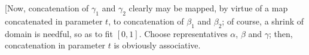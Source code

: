 \documentclass[12pt]{article}
\newcommand\aG\alpha \newcommand\bG\beta  \newcommand\gG\gamma \newcommand\dG\delta \newcommand\eG\varepsilon \newcommand\zG\zeta \newcommand\tG\theta \newcommand\kG\kappa \newcommand\lG\lambda \newcommand\sG\sigma \newcommand\fG\varphi \newcommand\oG\omega
\begin{document}
[Now, concatenation of \(\gG_1\) and \(\gG_2\) clearly may be mapped, by virtue of a map concatenated in parameter \(t\), to concatenation of \(\bG_1\) and \(\bG_2\); of course, a shrink of domain is needful, so as to fit \([0,1]\).  
Choose representatives \(\aG\), \(\bG\) and \(\gG\); then, concatenation in parameter \(t\) is obviously associative. \par
[Identity is the (trivial) class consisting solely of constant function that remains always at \(z_0\). \par
[Finally, consider a curve \(\gG\), and another one \(\tilde\gG\) with same path but opposite sense of rotation. 
Then \(\tilde\gG\) represents a class that consists of inverse of \(\gG\), for their multiplication is the identity.]
\end{document}
